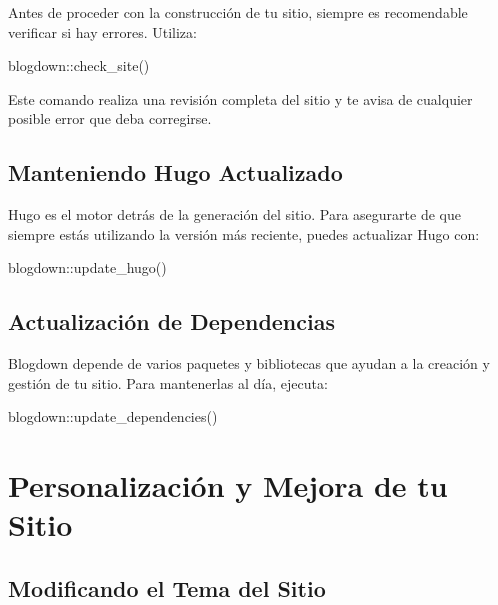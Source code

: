 \documentclass[
  doc,
  floatsintext,
  longtable,
  a4paper,
  nolmodern,
  notxfonts,
  notimes,
  colorlinks=true,linkcolor=blue,citecolor=blue,urlcolor=blue]{apa7}
\newenvironment{Shaded}{\begin{snugshade}}{\end{snugshade}}
\newcommand{\FunctionTok}[1]{\textcolor[rgb]{0.28,0.35,0.67}{#1}}
\newcommand{\NormalTok}[1]{\textcolor[rgb]{0.00,0.23,0.31}{#1}}
\newcommand{\SpecialCharTok}[1]{\textcolor[rgb]{0.37,0.37,0.37}{#1}}
\begin{document}
Antes de proceder con la construcción de tu sitio, siempre es
recomendable verificar si hay errores. Utiliza:

\begin{Shaded}
\begin{Highlighting}[]
\NormalTok{blogdown}\SpecialCharTok{::}\FunctionTok{check\_site}\NormalTok{()}
\end{Highlighting}
\end{Shaded}

Este comando realiza una revisión completa del sitio y te avisa de
cualquier posible error que deba corregirse.

\subsection{Manteniendo Hugo
Actualizado}\label{manteniendo-hugo-actualizado}

Hugo es el motor detrás de la generación del sitio. Para asegurarte de
que siempre estás utilizando la versión más reciente, puedes actualizar
Hugo con:

\begin{Shaded}
\begin{Highlighting}[]
\NormalTok{blogdown}\SpecialCharTok{::}\FunctionTok{update\_hugo}\NormalTok{()}
\end{Highlighting}
\end{Shaded}

\subsection{Actualización de
Dependencias}\label{actualizaciuxf3n-de-dependencias}

Blogdown depende de varios paquetes y bibliotecas que ayudan a la
creación y gestión de tu sitio. Para mantenerlas al día, ejecuta:

\begin{Shaded}
\begin{Highlighting}[]
\NormalTok{blogdown}\SpecialCharTok{::}\FunctionTok{update\_dependencies}\NormalTok{()}
\end{Highlighting}
\end{Shaded}

\section{Personalización y Mejora de tu
Sitio}\label{personalizaciuxf3n-y-mejora-de-tu-sitio}

\subsection{Modificando el Tema del
Sitio}\label{modificando-el-tema-del-sitio}
\end{document}
